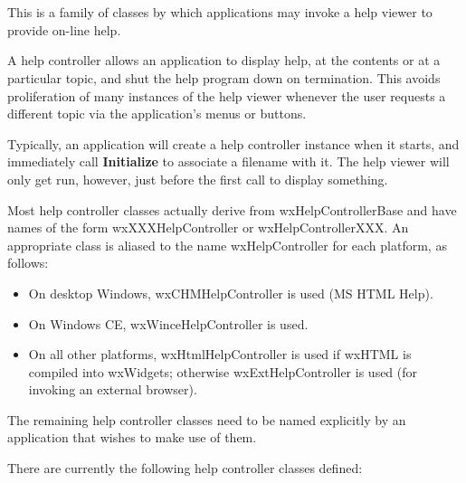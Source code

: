 \section{}\label{wxhelpcontroller}

This is a family of classes by which
applications may invoke a help viewer to provide on-line help.

A help controller allows an application to display help, at the contents
or at a particular topic, and shut the help program down on termination.
This avoids proliferation of many instances of the help viewer whenever the
user requests a different topic via the application's menus or buttons.

Typically, an application will create a help controller instance
when it starts, and immediately call {\bf Initialize}\rtfsp
to associate a filename with it. The help viewer will only get run, however,
just before the first call to display something.

Most help controller classes actually derive from wxHelpControllerBase and have
names of the form wxXXXHelpController or wxHelpControllerXXX. An
appropriate class is aliased to the name wxHelpController for each platform, as follows:

\begin{itemize}\itemsep=0pt
\item On desktop Windows, wxCHMHelpController is used (MS HTML Help).
\item On Windows CE, wxWinceHelpController is used.
\item On all other platforms, wxHtmlHelpController is used if wxHTML is
compiled into wxWidgets; otherwise wxExtHelpController is used (for invoking an external
browser).
\end{itemize}

The remaining help controller classes need to be named
explicitly by an application that wishes to make use of them.

There are currently the following help controller classes defined:

